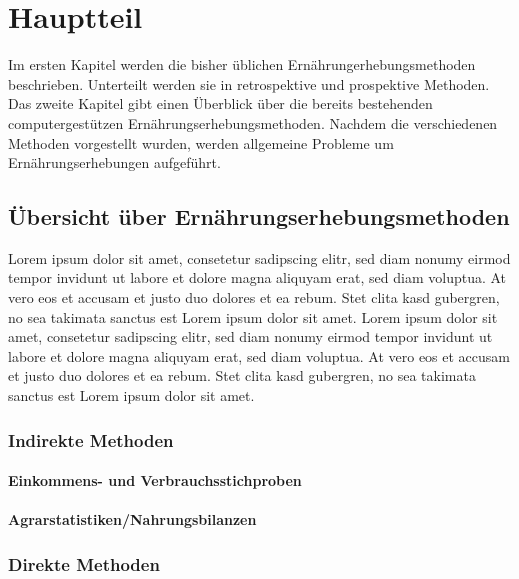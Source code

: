 \section{Hauptteil}
Im ersten Kapitel werden die bisher üblichen Ernährungerhebungsmethoden beschrieben. Unterteilt werden sie in retrospektive und prospektive Methoden. Das zweite Kapitel gibt einen Überblick über die bereits bestehenden computergestützen Ernährungserhebungsmethoden. Nachdem die verschiedenen Methoden vorgestellt wurden, werden allgemeine Probleme um Ernährungserhebungen aufgeführt. 

\subsection{Übersicht über Ernährungserhebungsmethoden}
Lorem ipsum dolor sit amet, consetetur sadipscing elitr, sed diam nonumy eirmod tempor invidunt ut labore et dolore magna aliquyam erat, sed diam voluptua. At vero eos et accusam et justo duo dolores et ea rebum. Stet clita kasd gubergren, no sea takimata sanctus est Lorem ipsum dolor sit amet. Lorem ipsum dolor sit amet, consetetur sadipscing elitr, sed diam nonumy eirmod tempor invidunt ut labore et dolore magna aliquyam erat, sed diam voluptua. At vero eos et accusam et justo duo dolores et ea rebum. Stet clita kasd gubergren, no sea takimata sanctus est Lorem ipsum dolor sit amet.

\subsubsection{Indirekte Methoden}

\paragraph{Einkommens- und Verbrauchsstichproben}

\paragraph{Agrarstatistiken/Nahrungsbilanzen}	

\subsubsection{Direkte Methoden}

